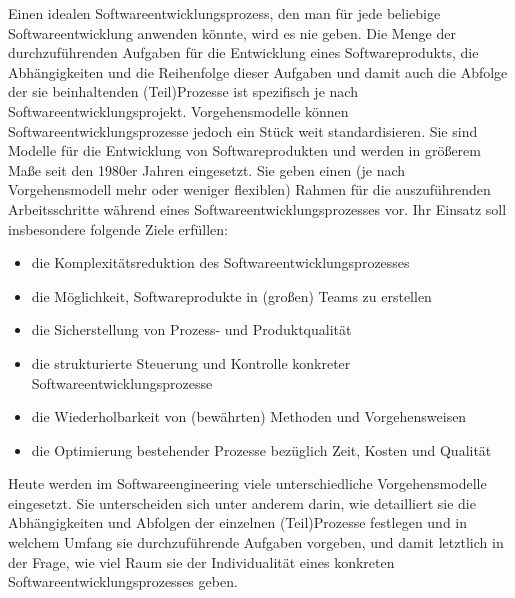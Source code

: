 Einen idealen Softwareentwicklungsprozess, den man für jede beliebige Softwareentwicklung anwenden könnte, wird es nie geben. Die Menge der durchzuführenden Aufgaben für die Entwicklung eines Softwareprodukts, die Abhängigkeiten und die Reihenfolge dieser Aufgaben und damit auch die Abfolge der sie beinhaltenden (Teil)Prozesse ist spezifisch je nach Softwareentwicklungsprojekt. Vorgehensmodelle können Softwareentwicklungsprozesse jedoch ein Stück weit standardisieren. Sie sind Modelle für die Entwicklung von Softwareprodukten und werden in größerem Maße seit den 1980er Jahren eingesetzt. Sie geben einen (je nach Vorgehensmodell mehr oder weniger flexiblen) Rahmen für die auszuführenden Arbeitsschritte während eines Softwareentwicklungsprozesses vor. Ihr Einsatz soll insbesondere folgende Ziele erfüllen: 
\begin{itemize}
	\item die Komplexitätsreduktion des Softwareentwicklungsprozesses
	\item die Möglichkeit, Softwareprodukte in (großen) Teams zu erstellen
	\item die Sicherstellung von Prozess- und Produktqualität
	\item die strukturierte Steuerung und Kontrolle konkreter Softwareentwicklungsprozesse
	\item die Wiederholbarkeit von (bewährten) Methoden und Vorgehensweisen
	\item die Optimierung bestehender Prozesse bezüglich Zeit, Kosten und Qualität
\end{itemize}

Heute werden im Softwareengineering viele unterschiedliche Vorgehensmodelle eingesetzt. Sie unterscheiden sich unter anderem darin, wie detailliert sie die Abhängigkeiten und Abfolgen der einzelnen (Teil)Prozesse festlegen und in welchem Umfang sie durchzuführende Aufgaben vorgeben, und damit letztlich in der Frage, wie viel Raum sie der Individualität eines konkreten Softwareentwicklungsprozesses geben.

